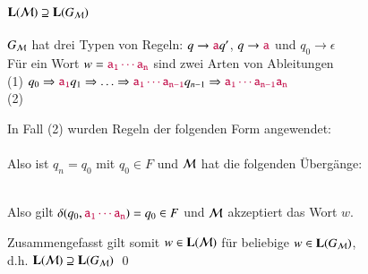 \documentclass[aspectratio=1610,onlymath]{beamer}
\begin{document}
\begin{frame}[t]\frametitle{$\textbf{\textcolor{black}{L}}(\mathcal{M})\supseteq\textbf{\textcolor{black}{L}}(G_{\mathcal{M}})$}

$G_{\mathcal{M}}$ hat drei Typen von Regeln: $q\to \mathtt{\textcolor{purple}{a}}q'$, $q\to \mathtt{\textcolor{purple}{a}}$ und $q_0\to \epsilon$
\\[1ex]

Für ein Wort $w=\mathtt{\textcolor{purple}{a_1\cdots a_n}}$ sind \alert{zwei} Arten von Ableitungen \\[1ex]

(1) $q_0\Rightarrow \mathtt{\textcolor{purple}{a_1}}q_1 \Rightarrow \ldots \Rightarrow\mathtt{\textcolor{purple}{a_1\cdots a_{n-1}}}q_{n-1}\Rightarrow \mathtt{\textcolor{purple}{a_1\cdots a_{n-1}a_n}}$\\[1ex]
(2) 
\bigskip\pause


In Fall (2) wurden Regeln der folgenden Form angewendet:\\[1ex]
\\[1ex]
Also ist $q_n=q_0$ mit $q_0\in F$ und $\mathcal{M}$ hat die folgenden Übergänge: \\[1ex]
\\[1ex]
\bigskip\pause

Also gilt $\delta(q_0,\mathtt{\textcolor{purple}{a_1\cdots a_n}})=q_0\in F$ und $\mathcal{M}$ akzeptiert das Wort $w$.
\bigskip

Zusammengefasst gilt somit $w\in\textbf{\textcolor{black}{L}}(\mathcal{M})$ für beliebige $w\in\textbf{\textcolor{black}{L}}(G_{\mathcal{M}})$,\\
d.h. $\textbf{\textcolor{black}{L}}(\mathcal{M})\supseteq\textbf{\textcolor{black}{L}}(G_{\mathcal{M}})$
\qed

\end{frame}
\end{document}

